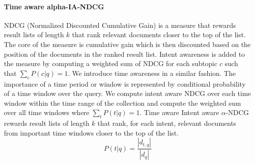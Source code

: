 




\paragraph{Time aware alpha-IA-NDCG}


NDCG (Normalized Discounted Cumulative Gain) is a measure that rewards result lists of length $k$ that rank relevant documents closer to the top of the list. The core of the measure is cumulative gain which is then discounted based on the position of the documents in the ranked result list. Intent awareness is added to the measure by computing a weighted sum of NDCG for each subtopic $c$ such that $\sum_{c} P(c|q) = 1$. We introduce time awareness in a similar fashion. The importance of a time period or window is represented by conditional probability of a time window over the query. We compute intent aware NDCG over each time window within the time range of the collection and compute the weighted sum over all time windows where $\sum_{t} P(t|q) = 1$. Time aware Intent aware $\alpha$-NDCG rewards result lists of length $k$ that rank, for each intent, relevant documents from important time windows closer to the top of the list.
\begin{equation}
P(t|q) =  \frac {|d_{t,q}|}{|d_{q}|}  
\end{equation}

